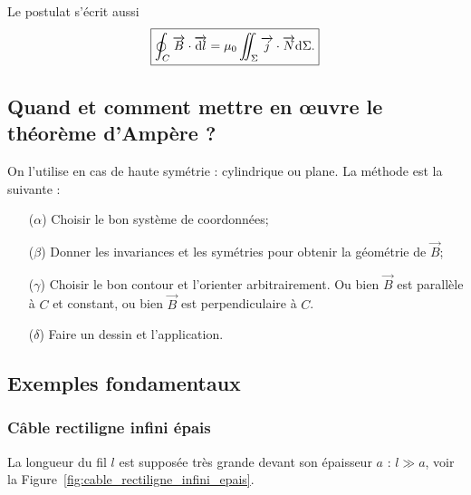         Le postulat s'écrit aussi
        \begin{equation*}
            \boxed{
                \oint_{C}\protect\overrightarrow{{B}}\cdot\protect\overrightarrow{{\mathrm{d} l}}=\mu_{0}\iint_{\Sigma}\protect\overrightarrow{{j}}\cdot\protect\overrightarrow{{N}}\mathrm{d}\Sigma.
            }
        \end{equation*}

    \subsection{Quand et comment mettre en œuvre le théorème d'Ampère ?}

        On l'utilise en cas de haute symétrie : cylindrique ou plane. La méthode est la suivante :
        \begin{enumerate}
            \item [($\alpha$)] Choisir le bon système de coordonnées;
            \item [($\beta$)] Donner les invariances et les symétries pour obtenir la géométrie de $\vec{B}$;
            \item [($\gamma$)] Choisir le bon contour et l'orienter arbitrairement. Ou bien $\vec{B}$ est parallèle à $C$ et constant, ou bien $\vec{B}$ est perpendiculaire à $C$.
            \item [($\delta$)] Faire un dessin et l'application.
        \end{enumerate}

    \subsection{Exemples fondamentaux}
        \subsubsection{Câble rectiligne infini épais}

            La longueur du fil $l$ est supposée très grande devant son épaisseur $a$ : $l\gg a$, voir la Figure~\ref{fig:cable_rectiligne_infini_epais}.

